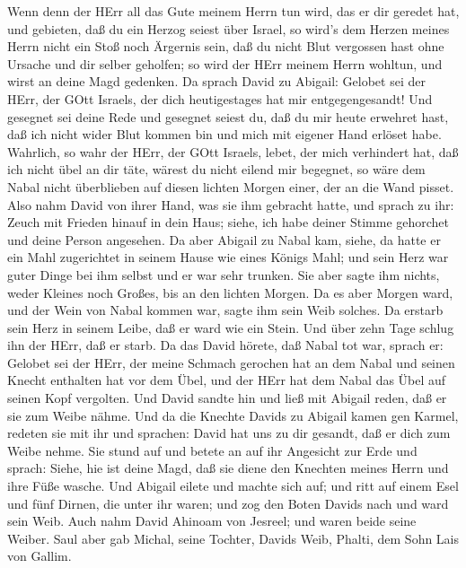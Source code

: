  Wenn denn der HErr all das Gute meinem Herrn tun wird, das
er dir geredet hat, und gebieten, daß du ein Herzog seiest über Israel,
 so wird's dem Herzen meines Herrn nicht ein Stoß noch
Ärgernis sein, daß du nicht Blut vergossen hast ohne Ursache und dir
selber geholfen; so wird der HErr meinem Herrn wohltun, und wirst an
deine Magd gedenken.  Da sprach David zu Abigail: Gelobet
sei der HErr, der GOtt Israels, der dich heutigestages hat mir
entgegengesandt!  Und gesegnet sei deine Rede und gesegnet
seiest du, daß du mir heute erwehret hast, daß ich nicht wider Blut
kommen bin und mich mit eigener Hand erlöset habe. 
Wahrlich, so wahr der HErr, der GOtt Israels, lebet, der mich verhindert
hat, daß ich nicht übel an dir täte, wärest du nicht eilend mir
begegnet, so wäre dem Nabal nicht überblieben auf diesen lichten Morgen
einer, der an die Wand pisset.  Also nahm David von ihrer
Hand, was sie ihm gebracht hatte, und sprach zu ihr: Zeuch mit Frieden
hinauf in dein Haus; siehe, ich habe deiner Stimme gehorchet und deine
Person angesehen.  Da aber Abigail zu Nabal kam, siehe, da
hatte er ein Mahl zugerichtet in seinem Hause wie eines Königs Mahl; und
sein Herz war guter Dinge bei ihm selbst und er war sehr trunken. Sie
aber sagte ihm nichts, weder Kleines noch Großes, bis an den lichten
Morgen.  Da es aber Morgen ward, und der Wein von Nabal
kommen war, sagte ihm sein Weib solches. Da erstarb sein Herz in seinem
Leibe, daß er ward wie ein Stein.  Und über zehn Tage
schlug ihn der HErr, daß er starb.  Da das David hörete,
daß Nabal tot war, sprach er: Gelobet sei der HErr, der meine Schmach
gerochen hat an dem Nabal und seinen Knecht enthalten hat vor dem Übel,
und der HErr hat dem Nabal das Übel auf seinen Kopf vergolten. Und David
sandte hin und ließ mit Abigail reden, daß er sie zum Weibe nähme.
 Und da die Knechte Davids zu Abigail kamen gen Karmel,
redeten sie mit ihr und sprachen: David hat uns zu dir gesandt, daß er
dich zum Weibe nehme.  Sie stund auf und betete an auf ihr
Angesicht zur Erde und sprach: Siehe, hie ist deine Magd, daß sie diene
den Knechten meines Herrn und ihre Füße wasche.  Und
Abigail eilete und machte sich auf; und ritt auf einem Esel und fünf
Dirnen, die unter ihr waren; und zog den Boten Davids nach und ward sein
Weib.  Auch nahm David Ahinoam von Jesreel; und waren beide
seine Weiber.  Saul aber gab Michal, seine Tochter, Davids
Weib, Phalti, dem Sohn Lais von Gallim.

